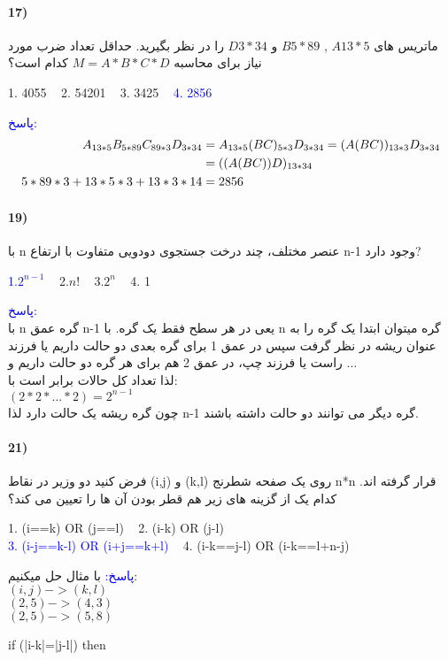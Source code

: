 \documentclass[10pt,a4paper]{article}
\begin{document}
	\paragraph{17)} ماتریس های $A13*5$ , $B5*89$ و $D3*34$ را در نظر بگیرید. حداقل تعداد ضرب مورد نیاز برای محاسبه $M=A*B*C*D$ کدام است؟
	\begin{flushright} 
		1. 4055\,\,\,\,\, 2. 54201\,\,\,\,\, 3. 3425\,\,\,\,\, \textcolor{blue}{4. 2856}
	\end{flushright}
	\begin{flushright} 
		\textcolor{blue}{پاسخ:}
		\begin{align}
			A_{13*5}B_{5*89}C_{89*3}D_{3*34} &= A_{13*5}(BC)_{5*3}D_{3*34} = (A(BC))_{13*3}D_{3*34} \notag\\
			&= ((A(BC))D)_{13*34} \notag \\
			5*89*3 + 13*5*3 + 13*3*14 &= 2856 \notag
		\end{align}
	\end{flushright}

	\paragraph{19)} با n عنصر مختلف، چند درخت جستجوی دودویی متفاوت با ارتفاع n-1 وجود دارد?
	\begin{flushright} 
		\textcolor{blue}{1.$2^{n-1}$}\,\,\,\,\, 2.$n!$\,\,\,\,\, 3.$2^n$\,\,\,\,\, 4. 1
	\end{flushright}
	\begin{flushright} 
		\textcolor{blue}{پاسخ:} \\
		با n گره عمق n-1 یعی در هر سطح فقط یک گره. با n گره میتوان ابتدا یک گره را به عنوان ریشه در نظر گرفت سپس در عمق 1 برای گره بعدی دو حالت داریم یا فرزند راست یا فرزند چپ، در عمق 2 هم برای هر گره دو حالت داریم و ... \\
		لذا تعداد کل حالات برابر است با: \\
		$(2*2*...*2) = 2^{n-1}$
		\\ چون گره ریشه یک حالت دارد لذا n-1 گره دیگر می توانند دو حالت داشته باشند. 
	\end{flushright}

	\paragraph{21)} فرض کنید دو وزیر در نقاط (i,j) و (k,l) روی یک صفحه شطرنج n*n قرار گرفته اند. کدام یک از گزینه های زیر هم قطر بودن آن ها را تعیین می کند؟
	\begin{flushright} 
		1. (i==k) OR (j==l)\,\,\,\,\, 2. (i-k) OR (j-l)\,\,\,\,\,\\ \textcolor{blue}{3. (i-j==k-l) OR (i+j==k+l)}\,\,\,\,\, 4. (i-k==j-l) OR (i-k==l+n-j)
	\end{flushright}
	\begin{flushright} 
		\textcolor{blue}{پاسخ:}
		با مثال حل میکنیم: \\
		$(i,j)->(k,l)$ \\
		$(2,5)->(4,3)$ \\
		$(2,5)->(5,8)$ \\
		\begin{latin} if (|i-k|=|j-l|) then \end{latin}
	\end{flushright}
\end{document}
